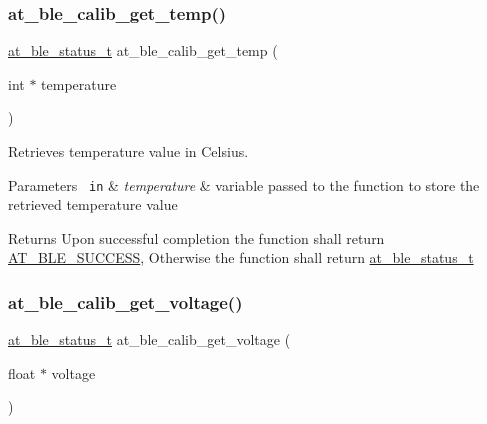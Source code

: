 \subsubsection{\texorpdfstring{at\_ble\_calib\_get\_temp()}{at\_ble\_calib\_get\_temp()}}
{\footnotesize\ttfamily \mbox{\hyperlink{group__error__codes__group_ga3b1db9b95feb157b3c188ca27fe76988}{at\+\_\+ble\+\_\+status\+\_\+t}} at\+\_\+ble\+\_\+calib\+\_\+get\+\_\+temp (\begin{DoxyParamCaption}\item[{int $\ast$}]{temperature }\end{DoxyParamCaption})}



Retrieves temperature value in Celsius. 


\begin{DoxyParams}[1]{Parameters}
\mbox{\texttt{ in}}  & {\em temperature} & variable passed to the function to store the retrieved temperature value\\
\hline
\end{DoxyParams}
\begin{DoxyReturn}{Returns}
Upon successful completion the function shall return \mbox{\hyperlink{group__error__codes__group_gga3b1db9b95feb157b3c188ca27fe76988a7e3bfff5387331cd4f2c56cbcbbd7e19}{A\+T\+\_\+\+B\+L\+E\+\_\+\+S\+U\+C\+C\+E\+SS}}, Otherwise the function shall return \mbox{\hyperlink{at__ble__api_8h_ace24eb4e5ca3f325c663b809da5feb92}{at\+\_\+ble\+\_\+status\+\_\+t}} 
\end{DoxyReturn}
\mbox{\label{group__calib__group_gabbca0578e51667ffaf6f7027745991ee}} 
\subsubsection{\texorpdfstring{at\_ble\_calib\_get\_voltage()}{at\_ble\_calib\_get\_voltage()}}
{\footnotesize\ttfamily \mbox{\hyperlink{group__error__codes__group_ga3b1db9b95feb157b3c188ca27fe76988}{at\+\_\+ble\+\_\+status\+\_\+t}} at\+\_\+ble\+\_\+calib\+\_\+get\+\_\+voltage (\begin{DoxyParamCaption}\item[{float $\ast$}]{voltage }\end{DoxyParamCaption})}



